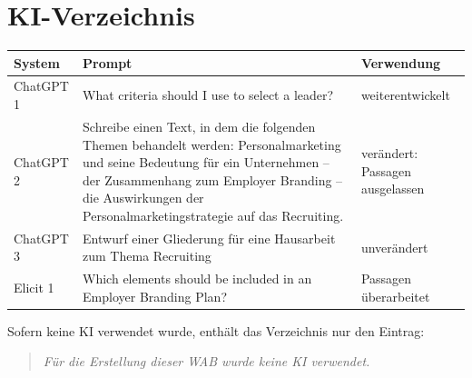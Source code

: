 \section{KI-Verzeichnis}												%


\begin{table}[h]
    \renewcommand{\arraystretch}{2}
    \centering
    \begin{tabular}{p{} p{} p{}}
        \toprule
        \large System&\large Prompt&\large Verwendung\\
        \midrule
        ChatGPT 1 & What criteria should I use to select a leader? & weiterentwickelt \\
        ChatGPT 2 & Schreibe einen Text, in dem die folgenden Themen behandelt werden: Personalmarketing und seine Bedeutung für ein Unternehmen – der Zusammenhang zum Employer Branding – die Auswirkungen der Personalmarketingstrategie auf das Recruiting.  & verändert: Passagen ausgelassen  \\
        ChatGPT 3 & Entwurf einer Gliederung für eine Hausarbeit zum Thema Recruiting  & unverändert \\
        Elicit 1& Which elements should be included in an Employer Branding Plan?  & Passagen überarbeitet  \\
        \bottomrule
    \end{tabular}
\end{table}

Sofern keine KI verwendet wurde, enthält das Verzeichnis nur den Eintrag:
\begin{verse}
    \textit{Für die Erstellung dieser WAB wurde keine KI verwendet.}
\end{verse}